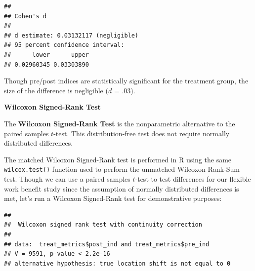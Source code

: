\documentclass[
]{book}
\newenvironment{Shaded}{\begin{snugshade}}{\end{snugshade}}
\newcommand{\AttributeTok}[1]{\textcolor[rgb]{0.77,0.63,0.00}{#1}}
\newcommand{\CommentTok}[1]{\textcolor[rgb]{0.56,0.35,0.01}{\textit{#1}}}
\newcommand{\ConstantTok}[1]{\textcolor[rgb]{0.00,0.00,0.00}{#1}}
\newcommand{\FunctionTok}[1]{\textcolor[rgb]{0.00,0.00,0.00}{#1}}
\newcommand{\NormalTok}[1]{#1}
\newcommand{\SpecialCharTok}[1]{\textcolor[rgb]{0.00,0.00,0.00}{#1}}
\begin{document}
\begin{verbatim}
## 
## Cohen's d
## 
## d estimate: 0.03132117 (negligible)
## 95 percent confidence interval:
##      lower      upper 
## 0.02960345 0.03303890
\end{verbatim}

Though pre/post indices are statistically significant for the treatment group, the size of the difference is negligible (\(d\) = .03).

\textbf{Wilcoxon Signed-Rank Test}

The \textbf{Wilcoxon Signed-Rank Test} is the nonparametric alternative to the paired samples \(t\)-test. This distribution-free test does not require normally distributed differences.

The matched Wilcoxon Signed-Rank test is performed in R using the same \texttt{wilcox.test()} function used to perform the unmatched Wilcoxon Rank-Sum test. Though we can use a paired samples \(t\)-test to test differences for our flexible work benefit study since the assumption of normally distributed differences is met, let's run a Wilcoxon Signed-Rank test for demonstrative purposes:

\begin{Shaded}
\end{Shaded}

\begin{verbatim}
## 
##  Wilcoxon signed rank test with continuity correction
## 
## data:  treat_metrics$post_ind and treat_metrics$pre_ind
## V = 9591, p-value < 2.2e-16
## alternative hypothesis: true location shift is not equal to 0
\end{verbatim}

\begin{Shaded}
\end{Shaded}
\end{document}
